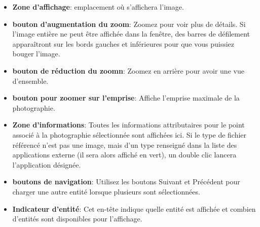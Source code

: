 
\begin{itemize}
\item \textbf{Zone d'affichage}: emplacement où s'affichera l'image.
\item \textbf{bouton d'augmentation du zoom}: Zoomez pour voir plus de détails. Si l'image entière ne peut être affichée dans la fenêtre, des barres de défilement apparaîtront sur les bords gauches et inférieures pour que vous puissiez bouger l'image.
\item \textbf{bouton de réduction du zoomn}: Zoomez en arrière pour avoir une vue d'ensemble.
\item \textbf{bouton pour zoomer sur l'emprise}: Affiche l'emprise maximale de la photographie.
\item \textbf{Zone d'informations}: Toutes les informations attributaires pour le point associé à la photographie sélectionnée sont affichées ici. Si le type de fichier référencé n'est pas une image, mais d'un type renseigné dans la liste des applications externe (il sera alors affiché en vert), un double clic lancera l'application désignée.
\item \textbf{boutons de navigation}: Utilisez les boutons Suivant et Précédent pour charger une autre entité lorsque  plusieurs sont sélectionnées.
\item \textbf{Indicateur d'entité}: Cet en-tête indique quelle entité est affichée et combien d'entités sont disponibles pour l'affichage.
\end{itemize}

